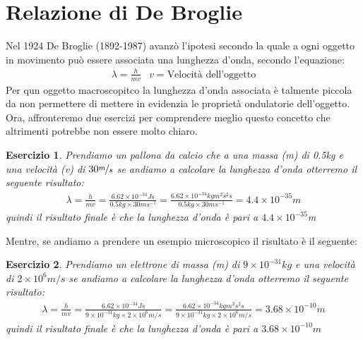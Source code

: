 \documentclass{book}
\newtheorem{ess}{Esercizio}[section]
\begin{document}
\section{Relazione di De Broglie}
\label{sec:deBroglie}
Nel 1924 De Broglie (1892-1987) avanzò l'ipotesi secondo la quale a ogni oggetto in movimento può essere associata
una lunghezza d'onda, secondo l'equazione:
\begin{eqnarray}
  \label{eq:deBroglie}
  \lambda = \frac{h}{mv} & v=\text{Velocità dell'oggetto}
\end{eqnarray}
Per qun oggetto macroscopitco la lunghezza  d'onda associata è talmente piccola da non permettere di mettere in
evidenzia le proprietà ondulatorie dell'oggetto.\\
Ora, affronteremo due esercizi per comprendere meglio questo concetto che altrimenti potrebbe non essere molto
chiaro.
\begin{ess}
  Prendiamo un pallona da calcio che a una massa (m) di 0.5kg e una velocità (v) di $30\nicefrac{m}{s}$ se andiamo a
  calcolare la lunghezza d'onda otterremo il seguente risultato:
  \begin{eqnarray*}
    \lambda=\frac{h}{mv} = \frac{6.62\times 10^{-34}Js}{0.5kg\times 30m s^{-1}}=\frac{6.62\times 10^{-34}kgm^2s^2s}{0.5kg\times 30m s^{-1}}=4.4\times 10^{-35}m
  \end{eqnarray*}
  quindi il risultato finale è che la lunghezza d'onda è pari a $4.4\times 10^{-35}$m
\end{ess}
Mentre, se andiamo a prendere un esempio microscopico il risultato è il seguente:
\begin{ess}
  Prendiamo un elettrone di massa (m) di $9\times 10^{-31}kg$ e una velocità di $2\times 10^{6}m/s$ se andiamo a
  calcolare la lunghezza d'onda otterremo il seguente risultato:
  \begin{eqnarray*}
    \lambda = \frac{h}{mv} = \frac{6.62\times 10^{-34}Js}{9\times 10^{-31}kg\times 2\times 10^{6}m/s}=\frac{6.62\times 10^{-34}kgm^2s^2s}{9\times 10^{-31}kg\times 2\times 10^{6}m/s}=3.68\times 10^{-10}m
  \end{eqnarray*}
  quindi il risultato finale è che la lunghezza d'onda è pari a $3.68\times 10^{-10}m$
\end{ess}
\end{document}
